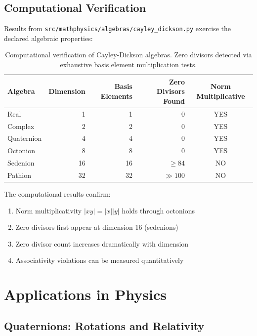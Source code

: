 \subsection{Computational Verification}

Results from \texttt{src/mathphysics/algebras/cayley\_dickson.py} exercise the declared algebraic properties:

\begin{table}[h]
\centering
\begin{tabular}{lrrrc}
\toprule
Algebra & Dimension & Basis Elements & Zero Divisors Found & Norm Multiplicative \\
\midrule
Real & 1 & 1 & 0 & \textcolor{validcolor}{YES} \\
Complex & 2 & 2 & 0 & \textcolor{validcolor}{YES} \\
Quaternion & 4 & 4 & 0 & \textcolor{validcolor}{YES} \\
Octonion & 8 & 8 & 0 & \textcolor{validcolor}{YES} \\
Sedenion & 16 & 16 & $\geq 84$ & \textcolor{claimcolor}{NO} \\
Pathion & 32 & 32 & $\gg 100$ & \textcolor{claimcolor}{NO} \\
\bottomrule
\end{tabular}
\caption{Computational verification of Cayley-Dickson algebras. Zero divisors detected via exhaustive basis element multiplication tests.}
\label{tab:computational_results}
\end{table}

The computational results confirm:
\begin{enumerate}
    \item Norm multiplicativity $|xy| = |x||y|$ holds through octonions
    \item Zero divisors first appear at dimension 16 (sedenions)
    \item Zero divisor count increases dramatically with dimension
    \item Associativity violations can be measured quantitatively
\end{enumerate}

\section{Applications in Physics}

\subsection{Quaternions: Rotations and Relativity}

